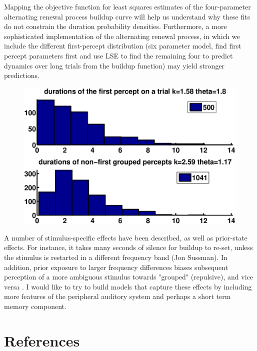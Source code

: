 \documentclass[10pt]{article}
\begin{document}
Mapping the objective function for least squares estimates of the four-parameter alternating renewal process buildup curve will help us understand why these fits do not constrain the duration probability densities. Furthermore, a more sophisticated implementation of the alternating renewal process, in which we include the different first-percept distribution (six parameter model, find first percept parameters first and use LSE to find the remaining four to predict dynamics over long trials from the buildup function) may yield stronger predictions.

\begin{figure}[scale=0.5]
   \begin{center}
   
   \includegraphics[scale=0.33]{../first_vs_other_hists}
   
   \caption{}
   	\label{fig:first_vs_other}
   \end{center}
\end{figure}



A number of stimulus-specific effects have been described, as well as prior-state effects. For instance, it takes many seconds of silence for buildup to re-set, unless the stimulus is restarted in a different frequency band (Jon Sussman). In addition, prior exposure to larger frequency differences biases subsequent perception of a more ambiguous stimulus towards "grouped" (repulsive), and vice versa \cite{Snyder2009}. I would like to try to build models that capture these effects by including more features of the peripheral auditory system and perhaps a short term memory component.


\section*{References}

\end{document}

